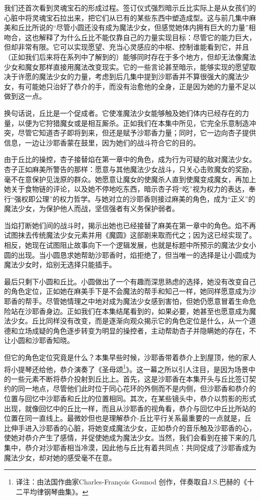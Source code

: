 我们还首次看到灵魂宝石的形成过程。签订仪式强烈暗示丘比实际上是从女孩们的心脏中将灵魂宝石拉出来，把它们从已有的某些东西中塑造成型。这与前几集中麻美和丘比所说的“尽管小圆还没有成为魔法少女，但感觉她体内拥有巨大的力量”相吻合，这也解释了为什么丘比不能仅靠自己的力量实现目标：尽管它的能力巨大，但却非常有限。它可以实现愿望、充当心灵感应的中枢、控制谁能看到它，并且（正如我们后来将在系列中了解到的）能够同时存在于多个地方，但却无法像魔法少女和魔女那样直接用魔法改变现实。它的一些言论甚至暗示，能够实现的愿望取决于许愿的魔法少女的力量，考虑到后几集中提到沙耶香并不算很强大的魔法少女，有可能她只治好了恭介的手，而没有治愈他的全身，正是因为她的力量不足以做到这一点。

换句话说，丘比是一个促成者。它使准魔法少女能够触及她们体内已经存在的力量，以便为它狩猎魔女或是相互厮杀。正如我们在本集中所见，它完全乐意制造冲突，尽管它知道杏子即将到来，但还是赋予沙耶香力量；同时，它一边向杏子提供信息，一边让沙耶香蒙在鼓里，因为她们的战斗符合它的目的。

由于丘比的操控，杏子接替焰在第一章中的角色，成为行为可疑的敌对魔法少女。杏子正如麻美所警告的那样：愿意与其他魔法少女战斗，只关心击败魔女的奖励，毫不在意保护见泷原的群众。她愿意让魔女的使魔杀人直到使魔变成魔女，再加上她关于食物链的评论，以及她不停地吃东西，暗示杏子将“吃”视为权力的表达，奉行“强权即公理”的权力哲学。与她对立的沙耶香则接过麻美的角色，成为“正义”的魔法少女，为保护他人而战，坚信强者有义务保护弱者。

当焰打断她们间的战斗时，揭示出她也已经接替了麻美在第一章中的角色。焰不再试图抹去传统魔法少女元素并用《魔圆》这部剧来取而代之；因为这已经实现了。相反，她现在试图阻止故事向下一个逻辑发展，也就是标题中所预示的魔法少女小圆的出现。当小圆恳求她帮助沙耶香时，焰拒绝了，但当唯一的选择是让小圆成为魔法少女时，焰别无选择只能插手。

最后只剩下小圆和丘比。小圆做出了一个有趣而深思熟虑的选择，她没有改变自己的角色定位，正如她在麻美手下是不会魔法的帮手和知己一样，她同样愿意成为沙耶香的帮手。尽管她情理之中地对成为魔法少女感到害怕，但她仍愿意冒着生命危险站在沙耶香身边。正如我们在本集结尾看到的，如果必要，她甚至也愿意成为魔法少女。丘比同样没有改变，而是逐渐向观众揭示它的角色定位是什么，从一个道德和立场成疑的角色逐步转变为明显的操控者，主动帮助杏子并隐瞒她的存在，不让小圆和沙耶香知晓。

但它的角色定位究竟是什么？本集早些时候，沙耶香带着恭介上到屋顶，他的家人将小提琴还给他，恭介演奏了《圣母颂\footnote{译注：由法国作曲家Charles-François Gounod 创作，伴奏取自J.S.巴赫的《十二平均律钢琴曲集》。}》。这一幕之所以引人注目，是因为场景中的一些元素不断将恭介投射到丘比上。首先，这是沙耶香在本集开头与丘比签订契约的同一地点，尽管他们此时位于同心花环的外侧而不是内侧，但沙耶香和恭介的位置与回忆中沙耶香和丘比的位置相同。其次，在某些镜头中，恭介以剪影的形式出现，就像回忆中的丘比一样，而且从沙耶香的视角看，恭介与回忆中丘比所站的位置在同一直线上。最微妙但也是理解恭介-丘比平行关系最重要的一点就是，丘比伸手进入沙耶香的心脏，将她变成魔法少女，正如恭介的音乐触及沙耶香的心，使她对恭介产生了感情，并促使她成为魔法少女。当然，我们会看到在接下来的几集中，恭介对沙耶香相当冷漠，因此他与丘比有着共同点：共同促成了沙耶香成为魔法少女，却对她的感受毫不在意。

